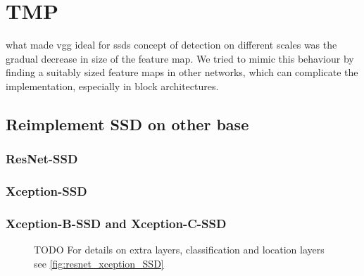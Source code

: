 \chapter{TMP}


what made vgg ideal for ssds concept of detection on different scales was the gradual decrease in size of the feature map. We tried to mimic this behaviour by finding a suitably sized feature maps in other networks, which can complicate the implementation, especially in block architectures.


\section{Reimplement SSD on other base}
\subsection{ResNet-SSD}


\subsection{Xception-SSD}




\subsection{Xception-B-SSD and Xception-C-SSD }
\begin{figure}
\centering
    \xceptionBSSD
     \caption{TODO For details on extra layers, classification and location layers see \cref{fig:resnet_xception_SSD}}
    \label{fig:xceptionBSSD}
\end{figure}

